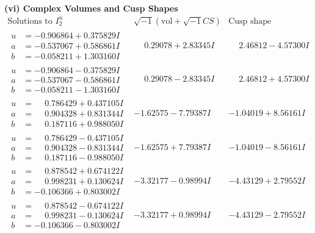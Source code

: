 \documentclass[1p]{elsarticle_modified}
\theoremstyle{definition}
\newcommand{\I}{\sqrt{-1}}
\begin{document}
\newpage\flushleft \textbf{(vi) Complex Volumes and Cusp Shapes}
$$\begin{array}{c|c|c}  
\text{Solutions to }I^u_{2}& \I (\text{vol} + \sqrt{-1}CS) & \text{Cusp shape}\\
 \hline 
\begin{aligned}
u &= -0.906864 + 0.375829 I \\
a &= -0.537067 + 0.586861 I \\
b &= -0.058211 + 1.303160 I\end{aligned}
 & \phantom{-}0.29078 + 2.83345 I & \phantom{-}2.46812 - 4.57300 I \\ \hline\begin{aligned}
u &= -0.906864 - 0.375829 I \\
a &= -0.537067 - 0.586861 I \\
b &= -0.058211 - 1.303160 I\end{aligned}
 & \phantom{-}0.29078 - 2.83345 I & \phantom{-}2.46812 + 4.57300 I \\ \hline\begin{aligned}
u &= \phantom{-}0.786429 + 0.437105 I \\
a &= \phantom{-}0.904328 + 0.831344 I \\
b &= \phantom{-}0.187116 + 0.988050 I\end{aligned}
 & -1.62575 - 7.79387 I & -1.04019 + 8.56161 I \\ \hline\begin{aligned}
u &= \phantom{-}0.786429 - 0.437105 I \\
a &= \phantom{-}0.904328 - 0.831344 I \\
b &= \phantom{-}0.187116 - 0.988050 I\end{aligned}
 & -1.62575 + 7.79387 I & -1.04019 - 8.56161 I \\ \hline\begin{aligned}
u &= \phantom{-}0.878542 + 0.674122 I \\
a &= \phantom{-}0.998231 + 0.130624 I \\
b &= -0.106366 + 0.803002 I\end{aligned}
 & -3.32177 - 0.98994 I & -4.43129 + 2.79552 I \\ \hline\begin{aligned}
u &= \phantom{-}0.878542 - 0.674122 I \\
a &= \phantom{-}0.998231 - 0.130624 I \\
b &= -0.106366 - 0.803002 I\end{aligned}
 & -3.32177 + 0.98994 I & -4.43129 - 2.79552 I \\ \hline\begin{aligned}

\end{aligned}
\end{array}$$
\end{document}
